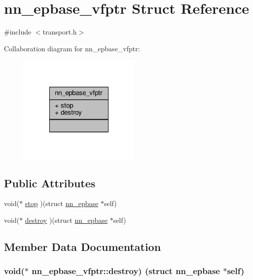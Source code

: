\hypertarget{structnn__epbase__vfptr}{}\section{nn\+\_\+epbase\+\_\+vfptr Struct Reference}
\label{structnn__epbase__vfptr}


{\ttfamily \#include $<$transport.\+h$>$}



Collaboration diagram for nn\+\_\+epbase\+\_\+vfptr\+:\nopagebreak
\begin{figure}[H]
\begin{center}
\leavevmode
\includegraphics[width=168pt]{structnn__epbase__vfptr__coll__graph}
\end{center}
\end{figure}
\subsection*{Public Attributes}
\begin{DoxyCompactItemize}
\item 
void($\ast$ \hyperlink{structnn__epbase__vfptr_ab512201fc6ce1ea50d196ea1201aa37d}{stop} )(struct \hyperlink{structnn__epbase}{nn\+\_\+epbase} $\ast$self)
\item 
void($\ast$ \hyperlink{structnn__epbase__vfptr_a880662a8b6bb442b37bbb7d3ccb76a8d}{destroy} )(struct \hyperlink{structnn__epbase}{nn\+\_\+epbase} $\ast$self)
\end{DoxyCompactItemize}


\subsection{Member Data Documentation}
\subsubsection[{destroy}]{\setlength{\rightskip}{0pt plus 5cm}void($\ast$ nn\+\_\+epbase\+\_\+vfptr\+::destroy) (struct {\bf nn\+\_\+epbase} $\ast$self)}\hypertarget{structnn__epbase__vfptr_a880662a8b6bb442b37bbb7d3ccb76a8d}{}\label{structnn__epbase__vfptr_a880662a8b6bb442b37bbb7d3ccb76a8d}
